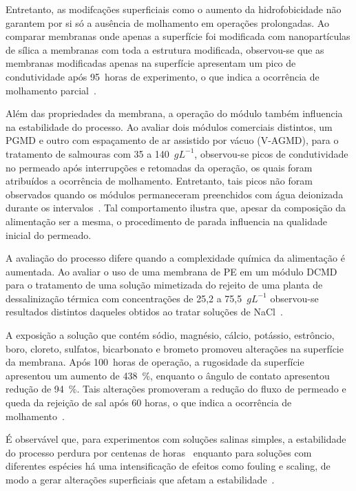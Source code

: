 Entretanto, as modifcações superficiais como o aumento da hidrofobicidade não garantem por si só a ausência de molhamento em operações prolongadas. Ao comparar membranas onde apenas a superfície foi modificada com nanopartículas de sílica a membranas com toda a estrutura modificada, observou-se que as membranas modificadas apenas na superfície apresentam um pico de condutividade após 95~horas de experimento, o que indica a ocorrência de molhamento parcial~\cite{Su2017}.

Além das propriedades da membrana, a operação do módulo também influencia na estabilidade do processo. Ao avaliar dois módulos comerciais distintos, um PGMD e outro com espaçamento de ar assistido por vácuo (V-AGMD), para o tratamento de salmouras com 35 a 140~$gL^{-1}$, observou-se picos de condutividade no permeado após interrupções e retomadas da operação, os quais foram atribuídos a ocorrência de molhamento. Entretanto, tais picos não foram observados quando os módulos permaneceram preenchidos com água deionizada durante os intervalos~\cite{RuizAguirre2019PermeateQuality}. Tal comportamento ilustra que, apesar da composição da alimentação ser a mesma, o procedimento de parada influencia na qualidade inicial do permeado.

A avaliação do processo difere quando a complexidade química da alimentação é aumentada. Ao avaliar o uso de uma membrana de PE em um módulo DCMD para o tratamento de uma solução mimetizada do rejeito de uma planta de dessalinização térmica com concentrações de 25,2 a 75,5~$gL^{-1}$ observou-se resultados distintos daqueles obtidos ao tratar soluções de NaCl~\cite{Abdelrazeq2022DCMD,Woo2021ElectrospunMD,Suga2021VMD}.

A exposição a solução que contém sódio, magnésio, cálcio, potássio, estrôncio, boro, cloreto, sulfatos, bicarbonato e brometo promoveu alterações na superfície da membrana. Após 100~horas de operação, a rugosidade da superfície apresentou um aumento de 438~\%, enquanto o ângulo de contato apresentou redução de 94~\%. Tais alterações promoveram a redução do fluxo de permeado e queda da rejeição de sal após 60 horas, o que indica a ocorrência de molhamento~\cite{Abdelrazeq2022DCMD}.

É observável que, para experimentos com soluções salinas simples, a estabilidade do processo perdura por centenas de horas~\cite{Woo2021ElectrospunMD,Suga2021VMD} enquanto para soluções com diferentes espécies há uma intensificação de efeitos como fouling e scaling, de modo a gerar alterações superficiais que afetam a estabilidade~\cite{Abdelrazeq2022DCMD}.

